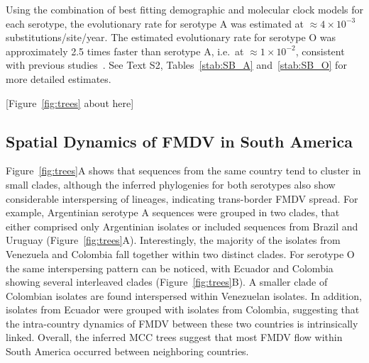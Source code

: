\documentclass[10pt]{article}
\begin{document}
Using the combination of best fitting demographic and molecular clock models for each serotype, the evolutionary rate for serotype A was estimated at $\approx 4 \times 10^{-3}$ substitutions/site/year.
The estimated evolutionary rate for serotype O was approximately 2.5 times faster than serotype A, i.e.~at $\approx 1 \times 10^{-2}$, consistent with previous studies~\cite{tully, Carvalho2013, Muellner2011}.
See Text S2, Tables~\ref{stab:SB_A} and~\ref{stab:SB_O} for more detailed estimates.

\begin{center}
 [Figure~\ref{fig:trees} about here]
\end{center}


\subsection*{Spatial Dynamics of FMDV in South America}

Figure~\ref{fig:trees}A shows that sequences from the same country tend to cluster in small clades, although the inferred phylogenies for both serotypes also show considerable interspersing of lineages, indicating trans-border FMDV spread.
For example, Argentinian serotype A sequences were grouped in two clades, that either comprised only Argentinian isolates or included sequences from Brazil and Uruguay (Figure~\ref{fig:trees}A).
Interestingly, the majority of the isolates from Venezuela and Colombia fall together within two distinct clades. %
For serotype O the same interspersing pattern can be noticed, with Ecuador and Colombia showing several interleaved clades (Figure~\ref{fig:trees}B).
A smaller clade of Colombian isolates are found interspersed within Venezuelan isolates.
In addition, isolates from Ecuador were grouped with isolates from Colombia, suggesting that the intra-country dynamics of FMDV between these two countries is intrinsically linked.
Overall, the inferred MCC trees suggest that most FMDV flow within South America occurred between neighboring countries. 
\end{document}
